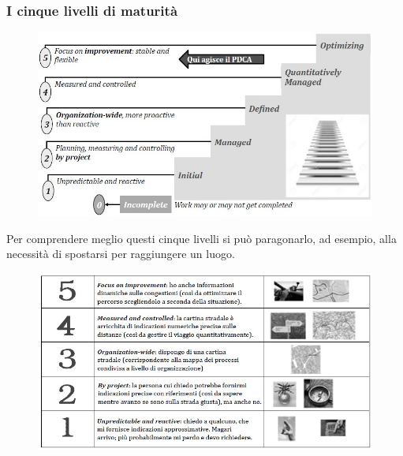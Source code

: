 \documentclass[../main]{subfiles}
\begin{document}
\subsubsection{I cinque livelli di maturità}
\begin{figure}[h]
    \begin{center}
        \includegraphics[scale=0.8]{immagini/maturita.jpg}
    \end{center}
\end{figure}
Per comprendere meglio questi cinque livelli si può paragonarlo, ad esempio, alla necessità di spostarsi per raggiungere un luogo.
\begin{figure}[h]
    \begin{center}
        \includegraphics[scale=0.8]{immagini/navigazione.jpg}
    \end{center}
\end{figure}
\end{document}
